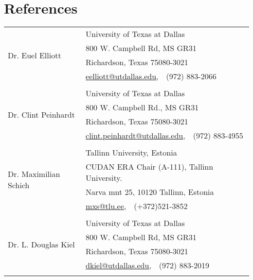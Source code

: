 \documentclass[a4paper,10pt]{article}
\begin{document}
\section{References}
\begin{tabular}{ll}
 \multirow{4}{*}{Dr. Euel Elliott} & University of Texas at Dallas \\ 
& 800 W. Campbell Rd, MS GR31\\
& Richardson, Texas 75080-3021\\
& \href{mailto:eelliott@utdallas.edu}{eelliott@utdallas.edu},~~(972) 883-2066\\
&\\


\multirow{4}{*}{Dr. Clint Peinhardt} & University of Texas at Dallas \\ 
& 800 W. Campbell Rd., MS GR31\\
& Richardson, Texas 75080-3021\\
& \href{mailto:clint.peinhardt@utdallas.edu}{clint.peinhardt@utdallas.edu},~~(972) 883-4955\\
&\\


\multirow{4}{*}{Dr. Maximilian Schich} & Tallinn University, Estonia\\
&CUDAN ERA Chair (A-111), Tallinn University.\\
& Narva mnt 25, 10120 Tallinn, Estonia\\ 
& \href{mailto:mxs@tlu.ee}{mxs@tlu.ee},~~(+372)521-3852\\
&\\


 \multirow{4}{*}{Dr. L. Douglas Kiel} & University of Texas at Dallas \\ 
& 800 W. Campbell Rd, MS GR31\\
& Richardson, Texas 75080-3021\\
& \href{mailto:dkiel@utdallas.edu}{dkiel@utdallas.edu},~~(972)  883-2019\\
&\\

\hline
\end{tabular}
\end{document}
